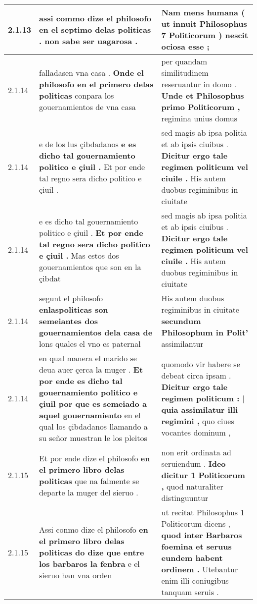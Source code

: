 \begin{tabular}{|p{1cm}|p{6.5cm}|p{6.5cm}|}
2.1.13 & assi commo dize el philosofo \textbf{ en el septimo delas politicas . } non sabe ser uagarosa . & Nam mens humana \textbf{ ( ut innuit Philosophus 7 Politicorum ) } nescit ociosa esse ; \\\hline
2.1.14 & falladasen vna casa . \textbf{ Onde el philosofo en el primero delas politicas } conpara los gouernamientos de vna casa & per quandam similitudinem reseruantur in domo . \textbf{ Unde et Philosophus primo Politicorum , } regimina unius domus \\\hline
2.1.14 & e de los lus çibdadanos \textbf{ e es dicho tal gouernamiento politico e çiuil . } Et por ende tal regno sera dicho politico e çiuil . & sed magis ab ipsa politia et ab ipsis ciuibus . \textbf{ Dicitur ergo tale regimen politicum vel ciuile . } His autem duobus regiminibus in ciuitate \\\hline
2.1.14 & e es dicho tal gouernamiento politico e çiuil . \textbf{ Et por ende tal regno sera dicho politico e çiuil . } Mas estos dos gouernamientos que son en la çibdat & sed magis ab ipsa politia et ab ipsis ciuibus . \textbf{ Dicitur ergo tale regimen politicum vel ciuile . } His autem duobus regiminibus in ciuitate \\\hline
2.1.14 & segunt el philosofo \textbf{ enlaspoliticas son semeiantes dos gouernamientos dela casa de } lons quales el vno es paternal & His autem duobus regiminibus in ciuitate \textbf{ secundum Philosophum in Polit’ } assimilantur \\\hline
2.1.14 & en qual manera el marido se deua auer çerca la muger . \textbf{ Et por ende es dicho tal gouernamiento politico e çiuil por que es semeiado a aquel gouernamiento } en el qual los çibdadanos llamando a su señor muestran le los pleitos & quomodo vir habere se debeat circa ipsam . \textbf{ Dicitur ergo tale regimen politicum : | quia assimilatur illi regimini , } quo ciues vocantes dominum , \\\hline
2.1.15 & Et por ende dize el philosofo \textbf{ en el primero libro delas politicas } que na falmente se departe la muger del sieruo . & non erit ordinata ad seruiendum . \textbf{ Ideo dicitur 1 Politicorum , } quod naturaliter distinguuntur \\\hline
2.1.15 & Assi conmo dize el philosofo \textbf{ en el primero libro delas politicas do dize que entre los barbaros la fenbra } e el sieruo han vna orden & ut recitat Philosophus 1 Politicorum dicens , \textbf{ quod inter Barbaros foemina et seruus eundem habent ordinem . } Utebantur enim illi coniugibus tanquam seruis . \\\hline

\end{tabular}
